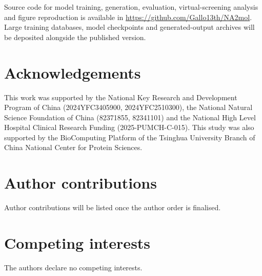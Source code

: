 \documentclass[pdflatex,sn-mathphys-num]{sn-jnl}
\theoremstyle{thmstyleone}
\theoremstyle{thmstyletwo}
\theoremstyle{thmstylethree}
\begin{document}
Source code for model training, generation, evaluation, virtual-screening analysis and figure reproduction is available in \url{https://github.com/Gallo13th/NA2mol}. Large training databases, model checkpoints and generated-output archives will be deposited alongside the published version.

\section*{Acknowledgements}

This work was supported by the National Key Research and Development Program of China (2024YFC3405900, 2024YFC2510300), the National Natural Science Foundation of China (82371855, 82341101) and the National High Level Hospital Clinical Research Funding (2025-PUMCH-C-015). This study was also supported by the BioComputing Platform of the Tsinghua University Branch of China National Center for Protein Sciences.

\section*{Author contributions}

Author contributions will be listed once the author order is finalised.

\section*{Competing interests}

The authors declare no competing interests.




\newpage
\end{document}
